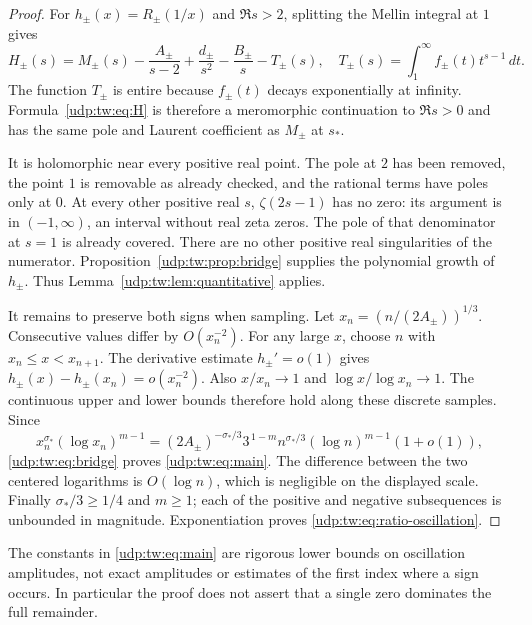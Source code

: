 \documentclass[11pt]{article}
\theoremstyle{remark}\newtheorem{remark}[theorem]{Remark}
\numberwithin{equation}{section}
\begin{document}
\begin{proof}
For $h_\pm(x)=R_\pm(1/x)$ and $\Re s>2$, splitting the Mellin integral
at $1$ gives
\begin{equation}
 H_\pm(s)=M_\pm(s)-\frac{A_\pm}{s-2}
               +\frac{d_\pm}{s^2}-\frac{B_\pm}{s}-T_\pm(s),
 \quad
 T_\pm(s)=\int_1^\infty f_\pm(t)t^{s-1}\,dt .
 \label{udp:tw:eq:H}
\end{equation}
The function $T_\pm$ is entire because $f_\pm(t)$ decays
exponentially at infinity. Formula~\eqref{udp:tw:eq:H} is therefore a
meromorphic continuation to $\Re s>0$ and has the same pole and
Laurent coefficient as $M_\pm$ at $s_*$.

It is holomorphic near every positive real point.
The pole at $2$ has been removed, the point $1$ is removable as
already checked, and the rational terms have poles only at $0$.
At every other positive real $s$, $\zeta(2s-1)$ has no zero:
its argument is in $(-1,\infty)$, an interval without real zeta
zeros. The pole of that denominator at $s=1$ is already covered.
There are no other positive real singularities of the numerator.
Proposition~\ref{udp:tw:prop:bridge} supplies the polynomial growth of
$h_\pm$. Thus Lemma~\ref{udp:tw:lem:quantitative} applies.

It remains to preserve both signs when sampling.
Let $x_n=(n/(2A_\pm))^{1/3}$.
Consecutive values differ by $O(x_n^{-2})$.
For any large $x$, choose $n$ with $x_n\le x<x_{n+1}$.
The derivative estimate $h_\pm'=o(1)$ gives
$h_\pm(x)-h_\pm(x_n)=o(x_n^{-2})$.
Also $x/x_n\to1$ and $\log x/\log x_n\to1$.
The continuous upper and lower bounds therefore hold along these
discrete samples. Since
\[
 x_n^{\sigma_*}(\log x_n)^{m-1}
 =(2A_\pm)^{-\sigma_*/3}3^{\,1-m}
 n^{\sigma_*/3}(\log n)^{m-1}(1+o(1)),
\]
\eqref{udp:tw:eq:bridge} proves \eqref{udp:tw:eq:main}.
The difference between the two centered logarithms is $O(\log n)$,
which is negligible on the displayed scale.
Finally $\sigma_*/3\ge1/4$ and $m\ge1$; each of the positive and
negative subsequences is unbounded in magnitude.
Exponentiation proves \eqref{udp:tw:eq:ratio-oscillation}.
\end{proof}

The constants in \eqref{udp:tw:eq:main} are rigorous lower bounds on
oscillation amplitudes, not exact amplitudes or estimates of the
first index where a sign occurs. In particular the proof does not
assert that a single zero dominates the full remainder.
\end{document}
